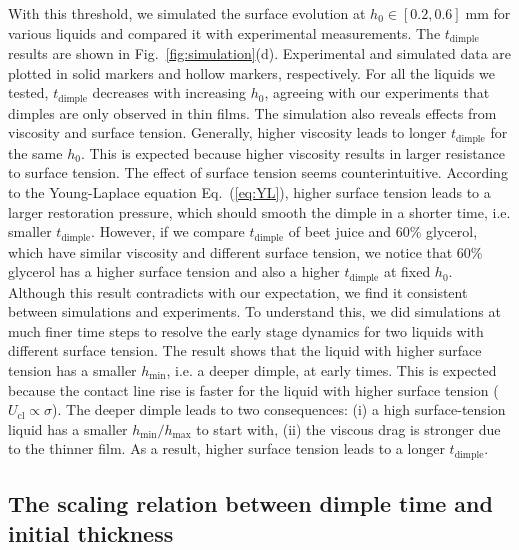 \documentclass[aps,prfluids,amsmath,amssymb,superscriptaddress,longbibliography]{revtex4-2}
\begin{document}
With this threshold, we simulated the surface evolution at $h_0\in[0.2,0.6]\;\mathrm{mm}$ for various liquids and compared it with experimental measurements.
The $t_{\mathrm{dimple}}$ results are shown in Fig.~\ref{fig:simulation}(d).
Experimental and simulated data are plotted in solid markers and hollow markers, respectively. 
For all the liquids we tested, $t_{\mathrm{dimple}}$ decreases with increasing $h_0$, agreeing with our experiments that dimples are only observed in thin films.
The simulation also reveals effects from viscosity and surface tension. 
Generally, higher viscosity leads to longer $t_{\mathrm{dimple}}$ for the same $h_0$.
This is expected because higher viscosity results in larger resistance to surface tension. 
The effect of surface tension seems counterintuitive.
According to the Young-Laplace equation Eq.~(\ref{eq:YL}), higher surface tension leads to a larger restoration pressure, which should smooth the dimple in a shorter time, i.e. smaller $t_\mathrm{dimple}$.
However, if we compare $t_\mathrm{dimple}$ of beet juice and 60\% glycerol, which have similar viscosity and different surface tension, we notice that 60\% glycerol has a higher surface tension and also a higher $t_{\mathrm{dimple}}$ at fixed $h_0$. 
Although this result contradicts with our expectation, we find it  consistent between simulations and experiments.
To understand this, we did simulations at much finer time steps to resolve the early stage dynamics for two liquids with different surface tension.
The result shows that the liquid with higher surface tension has a smaller $h_\mathrm{min}$, i.e. a deeper dimple, at early times. 
This is expected because the contact line rise is faster for the liquid with higher surface tension ($U_{\mathrm{cl}}\propto\sigma$).
The deeper dimple leads to two consequences: (i) a high surface-tension liquid has a smaller $h_\mathrm{min}/h_\mathrm{max}$ to start with, (ii) the viscous drag is stronger due to the thinner film. 
As a result, higher surface tension leads to a longer $t_{\mathrm{dimple}}$.

\subsection{The scaling relation between dimple time and initial thickness}\label{sec:time-scale}
\end{document}
